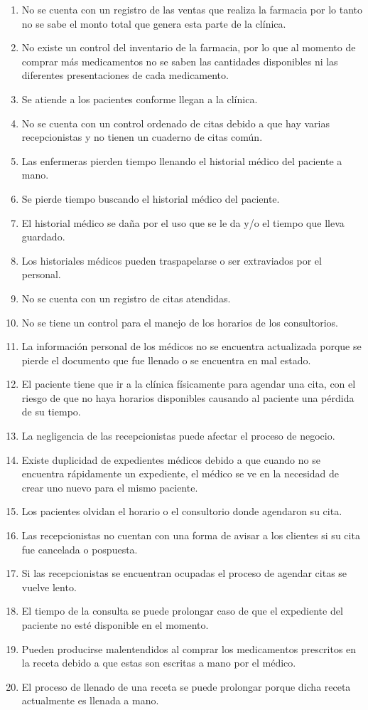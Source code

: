 \begin{enumerate}
\item No se cuenta con un registro de las ventas que realiza la farmacia por lo tanto no se sabe el monto total que genera esta parte de la clínica.
\item No existe un control del inventario de la farmacia, por lo que al momento de comprar más medicamentos no se saben las cantidades disponibles ni las diferentes presentaciones de cada medicamento.
\item Se atiende a los pacientes conforme llegan a la clínica.
\item No se cuenta con un control ordenado de citas debido a que hay varias recepcionistas y no tienen un cuaderno de citas común.
\item Las enfermeras pierden tiempo llenando el historial médico del paciente a mano.
\item Se pierde tiempo buscando el historial médico del paciente.
\item El historial médico se daña por el uso que se le da y/o el tiempo que lleva guardado.
\item Los historiales médicos pueden traspapelarse o ser extraviados por el personal.
\item No se cuenta con un registro de citas atendidas. 
\item No se tiene un control para el manejo de los horarios de los consultorios.
\item La información personal de los médicos no se encuentra actualizada porque se pierde el documento que fue llenado o se encuentra en mal estado.
\item El paciente tiene que ir a la clínica físicamente para agendar una cita, con el riesgo de que no haya horarios disponibles causando al paciente una pérdida de su tiempo.
\item La negligencia de las recepcionistas puede afectar el proceso de negocio.
\item Existe duplicidad de expedientes médicos debido a que cuando no se encuentra rápidamente un expediente, el médico se ve en la necesidad de crear uno nuevo para el mismo paciente. 
\item Los pacientes olvidan el horario o el consultorio donde agendaron su cita.
\item Las recepcionistas no cuentan con una forma de avisar a los clientes si su cita fue cancelada o pospuesta. 
\item Si las recepcionistas se encuentran ocupadas el proceso de agendar citas se vuelve lento.
\item El tiempo de la consulta se puede prolongar caso de que el expediente del paciente no esté disponible en el momento.
\item Pueden producirse malentendidos al comprar los medicamentos prescritos en la receta debido a que estas son escritas a mano por el médico.
\item El proceso de llenado de una receta se puede prolongar porque dicha receta actualmente es llenada a mano.
\end{enumerate}
